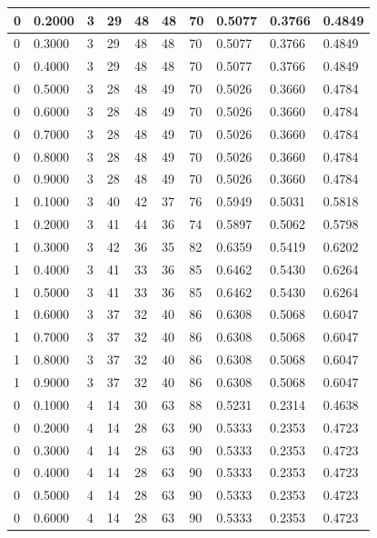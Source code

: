 \documentclass[12pt]{article}
\begin{document}
\begin{table}
{\begin{tabular}{| l | l | l | l | l | l | l | l | l | l |}
			0 & 0.2000 & 3 & 29 & 48 & 48 & 70 & 0.5077 & 0.3766 & 0.4849\\ \hline
			0 & 0.3000 & 3 & 29 & 48 & 48 & 70 & 0.5077 & 0.3766 & 0.4849\\ \hline
			0 & 0.4000 & 3 & 29 & 48 & 48 & 70 & 0.5077 & 0.3766 & 0.4849\\ \hline
			0 & 0.5000 & 3 & 28 & 48 & 49 & 70 & 0.5026 & 0.3660 & 0.4784\\ \hline
			0 & 0.6000 & 3 & 28 & 48 & 49 & 70 & 0.5026 & 0.3660 & 0.4784\\ \hline
			0 & 0.7000 & 3 & 28 & 48 & 49 & 70 & 0.5026 & 0.3660 & 0.4784\\ \hline
			0 & 0.8000 & 3 & 28 & 48 & 49 & 70 & 0.5026 & 0.3660 & 0.4784\\ \hline
			0 & 0.9000 & 3 & 28 & 48 & 49 & 70 & 0.5026 & 0.3660 & 0.4784\\ \hline
			1 & 0.1000 & 3 & 40 & 42 & 37 & 76 & 0.5949 & 0.5031 & 0.5818\\ \hline
			1 & 0.2000 & 3 & 41 & 44 & 36 & 74 & 0.5897 & 0.5062 & 0.5798\\ \hline
			1 & 0.3000 & 3 & 42 & 36 & 35 & 82 & 0.6359 & 0.5419 & 0.6202\\ \hline
			1 & 0.4000 & 3 & 41 & 33 & 36 & 85 & 0.6462 & 0.5430 & 0.6264\\ \hline
			1 & 0.5000 & 3 & 41 & 33 & 36 & 85 & 0.6462 & 0.5430 & 0.6264\\ \hline
			1 & 0.6000 & 3 & 37 & 32 & 40 & 86 & 0.6308 & 0.5068 & 0.6047\\ \hline
			1 & 0.7000 & 3 & 37 & 32 & 40 & 86 & 0.6308 & 0.5068 & 0.6047\\ \hline
			1 & 0.8000 & 3 & 37 & 32 & 40 & 86 & 0.6308 & 0.5068 & 0.6047\\ \hline
			1 & 0.9000 & 3 & 37 & 32 & 40 & 86 & 0.6308 & 0.5068 & 0.6047\\ \hline
			0 & 0.1000 & 4 & 14 & 30 & 63 & 88 & 0.5231 & 0.2314 & 0.4638\\ \hline
			0 & 0.2000 & 4 & 14 & 28 & 63 & 90 & 0.5333 & 0.2353 & 0.4723\\ \hline
			0 & 0.3000 & 4 & 14 & 28 & 63 & 90 & 0.5333 & 0.2353 & 0.4723\\ \hline
			0 & 0.4000 & 4 & 14 & 28 & 63 & 90 & 0.5333 & 0.2353 & 0.4723\\ \hline
			0 & 0.5000 & 4 & 14 & 28 & 63 & 90 & 0.5333 & 0.2353 & 0.4723\\ \hline
			0 & 0.6000 & 4 & 14 & 28 & 63 & 90 & 0.5333 & 0.2353 & 0.4723\\ \hline

\end{tabular}}
\end{table}
\end{document}
